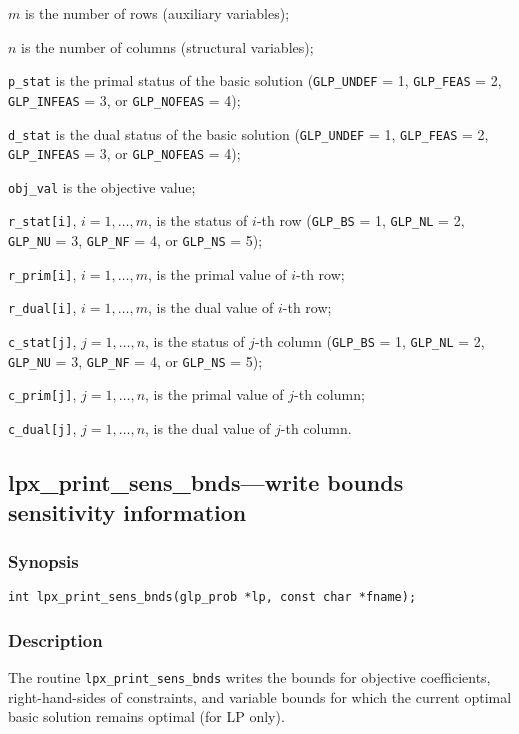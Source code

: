 \noindent
$m$ is the number of rows (auxiliary variables);

\noindent
$n$ is the number of columns (structural variables);

\noindent
\verb|p_stat| is the primal status of the basic solution
(\verb|GLP_UNDEF| = 1, \verb|GLP_FEAS| = 2, \verb|GLP_INFEAS| = 3, or
\verb|GLP_NOFEAS| = 4);

\noindent
\verb|d_stat| is the dual status of the basic solution
(\verb|GLP_UNDEF| = 1, \verb|GLP_FEAS| = 2, \verb|GLP_INFEAS| = 3, or
\verb|GLP_NOFEAS| = 4);

\noindent
\verb|obj_val| is the objective value;

\noindent
\verb|r_stat[i]|, $i=1,\dots,m$, is the status of $i$-th row
(\verb|GLP_BS| = 1, \verb|GLP_NL| = 2, \verb|GLP_NU| = 3,
\verb|GLP_NF| = 4, or \verb|GLP_NS| = 5);

\noindent
\verb|r_prim[i]|, $i=1,\dots,m$, is the primal value of $i$-th row;

\noindent
\verb|r_dual[i]|, $i=1,\dots,m$, is the dual value of $i$-th row;

\noindent
\verb|c_stat[j]|, $j=1,\dots,n$, is the status of $j$-th column
(\verb|GLP_BS| = 1, \verb|GLP_NL| = 2, \verb|GLP_NU| = 3,
\verb|GLP_NF| = 4, or \verb|GLP_NS| = 5);

\noindent
\verb|c_prim[j]|, $j=1,\dots,n$, is the primal value of $j$-th column;

\noindent
\verb|c_dual[j]|, $j=1,\dots,n$, is the dual value of $j$-th column.

\subsection{lpx\_print\_sens\_bnds---write bounds sensitivity
information}

\subsubsection*{Synopsis}

\begin{verbatim}
int lpx_print_sens_bnds(glp_prob *lp, const char *fname);
\end{verbatim}

\subsubsection*{Description}

The routine \verb|lpx_print_sens_bnds| writes the bounds for objective
coefficients, right-hand-sides of constraints, and variable bounds
for which the current optimal basic solution remains optimal (for LP
only).

